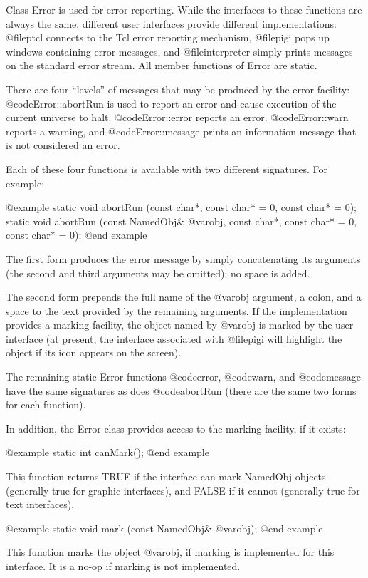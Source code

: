 Class Error is used for error reporting.  While the interfaces to
these functions are always the same, different user interfaces provide
different implementations: @file{ptcl} connects to the Tcl error
reporting mechanism, @file{pigi} pops up windows containing error
messages, and @file{interpreter} simply prints messages on the standard
error stream.  All member functions of Error are static.

There are four ``levels'' of messages that may be produced by the error
facility: @code{Error::abortRun} is used to report an error and cause execution
of the current universe to halt.
@code{Error::error} reports an error.
@code{Error::warn} reports a warning, and @code{Error::message} prints
an information message that is not considered an error.

Each of these four functions is available with two different signatures.
For example:

@example
static void abortRun (const char*, const char* = 0, const char* = 0);
static void abortRun (const NamedObj& @var{obj}, const char*, const char* = 0,
                      const char* = 0);
@end example

The first form produces the error message by simply concatenating its
arguments (the second and third arguments may be omitted); no space is
added.

The second form prepends the full name of the @var{obj} argument, a
colon, and a space to the text provided by the remaining arguments.
If the implementation provides a marking facility, the object named
by @var{obj} is marked by the user interface (at present, the interface
associated with @file{pigi} will highlight the object if its icon
appears on the screen).

The remaining static Error functions @code{error}, @code{warn}, and
@code{message} have the same signatures as does @code{abortRun} (there
are the same two forms for each function).

In addition, the Error class provides access to the marking facility,
if it exists:

@example
static int canMark();
@end example

This function returns TRUE if the interface can mark NamedObj objects
(generally true for graphic interfaces), and FALSE if it cannot
(generally true for text interfaces).

@example
static void mark (const NamedObj& @var{obj});
@end example

This function marks the object @var{obj}, if marking is implemented for
this interface.  It is a no-op if marking is not implemented.


